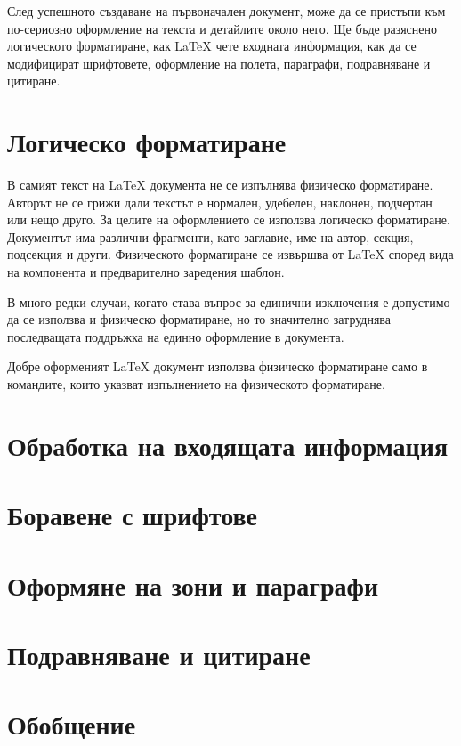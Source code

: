 След успешното създаване на първоначален документ, може да се пристъпи към по-сериозно оформление на текста и детайлите около него. Ще бъде разяснено логическото форматиране, как LaTeX чете входната информация, как да се модифицират шрифтовете, оформление на полета, параграфи, подравняване и цитиране.

\section{Логическо форматиране}

В самият текст на LaTeX документа не се изпълнява физическо форматиране. Авторът не се грижи дали текстът е нормален, удебелен, наклонен, подчертан или нещо друго. За целите на оформлението се използва логическо форматиране. Документът има различни фрагменти, като заглавие, име на автор, секция, подсекция и други. Физическото форматиране се извършва от LaTeX според вида на компонента и предварително заредения шаблон. 

В много редки случаи, когато става въпрос за единични изключения е допустимо да се използва и физическо форматиране, но то значително затруднява последващата поддръжка на единно оформление в документа.

Добре оформеният LaTeX документ използва физическо форматиране само в командите, които указват изпълнението на физическото форматиране.

\section{Обработка на входящата информация}



\section{Боравене с шрифтове}



\section{Оформяне на зони и параграфи}



\section{Подравняване и цитиране}



\section*{Обобщение}




